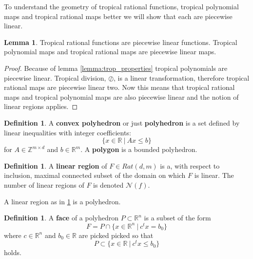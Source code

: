 \documentclass{article}
\theoremstyle{definition}
\newtheorem{lemma}[theorem]{Lemma}
\newtheorem{definition}[theorem]{Definition}
\begin{document}
To understand the geometry of tropical rational functions, tropical polynomial maps and tropical rational maps better we will show that each are piecewise linear.


\begin{lemma}
Tropical rational functions are piecewise linear functions. Tropical polynomial maps and tropical rational maps are piecewise linear maps.
\end{lemma}
\begin{proof}
Because of lemma \ref{lemma:trop_properties} tropical polynomials are piecewise linear. Tropical division, $\oslash$, is a linear transformation, therefore tropical rational maps are piecewise linear two. Now this means that tropical rational maps and tropical polynomial maps are also piecewise linear and the notion of linear regions applies.
\end{proof}

\begin{definition}\cite[p.~4]{zhang2018tropical}
A \textbf{convex polyhedron} or just \textbf{polyhedron} is a set defined by linear inequalities with integer coefficients:
$$\{x \in \mathbb{R} \ | \ Ax \leq b \}$$
for $A \in \mathbb{Z}^{m \times d}$ and $b \in \mathbb{R}^{m}$. A \textbf{polygon} is a bounded polyhedron.
\end{definition}

\begin{definition}\cite[p.~4]{zhang2018tropical}
\label{def:lin_reg_of}
A \textbf{linear region} of $F \in Rat(d, m)$ is a, with respect to inclusion, maximal connected subset of the domain on which $F$ is linear. The number of linear regions of $F$ is denoted $\mathcal{N}(f)$.
\end{definition}
A linear region as in \ref{def:lin_reg_of} is a polyhedron.
\begin{definition}
A \textbf{face} of a polyhedron $P \subset \mathbb{R}^{n}$ is a subset of the form
$$F= P \cap \{x \in \mathbb{R}^{n} \ | \ c^{t}x = b_0 \}$$
where $c \in \mathbb{R}^{n}$ and $b_0 \in \mathbb{R}$ are picked picked so that
$$P \subset \{ x \in \mathbb{R} \ | \ c^{t}x \leq b_0 \}$$
holds.
\end{definition}
\end{document}
